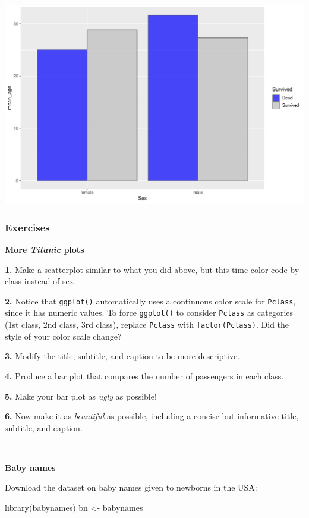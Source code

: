 \documentclass[
]{book}
\newenvironment{Shaded}{\begin{snugshade}}{\end{snugshade}}
\newcommand{\FunctionTok}[1]{\textcolor[rgb]{0.00,0.00,0.00}{#1}}
\newcommand{\NormalTok}[1]{#1}
\newcommand{\OtherTok}[1]{\textcolor[rgb]{0.56,0.35,0.01}{#1}}
\begin{document}
\includegraphics[width=694.08px]{figures/unnamed-chunk-171-1}

\hypertarget{exercises-5}{%
\subsubsection*{Exercises}\label{exercises-5}}

\textbf{More \emph{Titanic} plots}

\textbf{1.} Make a scatterplot similar to what you did above, but this time color-code by class instead of sex.

\textbf{2.} Notice that \texttt{ggplot()} automatically uses a continuous color scale for \texttt{Pclass}, since it has numeric values. To force \texttt{ggplot()} to consider \texttt{Pclass} as categories (1st class, 2nd class, 3rd class), replace \texttt{Pclass} with \texttt{factor(Pclass)}. Did the style of your color scale change?

\textbf{3.} Modify the title, subtitle, and caption to be more descriptive.

\textbf{4.} Produce a bar plot that compares the number of passengers in each class.

\textbf{5.} Make your bar plot as \emph{ugly} as possible!

\textbf{6.} Now make it as \emph{beautiful} as possible, including a concise but informative title, subtitle, and caption.

~

\textbf{Baby names}

Download the dataset on baby names given to newborns in the USA:

\begin{Shaded}
\begin{Highlighting}[]
\FunctionTok{library}\NormalTok{(babynames)}
\NormalTok{bn }\OtherTok{\textless{}{-}}\NormalTok{ babynames}
\end{Highlighting}
\end{Shaded}
\end{document}

